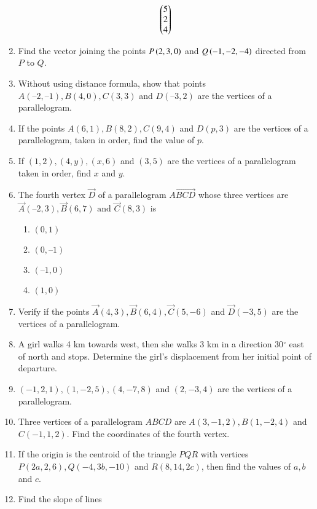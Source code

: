 \begin{enumerate}[label=\thesubsection.\arabic*,ref=\thesubsection.\theenumi]
\begin{align}
	\begin{pmatrix}5 \\ 2 \\ 4\end{pmatrix}  
\end{align}
\item Find the vector joining the points $P\left(2,3,0\right)$ and $Q\left(-1,-2,-4\right)$ directed from $P$ to $Q$.
\item Without using distance formula, show that points $A(– 2, – 1), B(4, 0), C(3, 3)$ and $D(–3, 2)$ are the vertices of a parallelogram.
\label{chapters/11/10/1/9}
\\
\solution

\item If the points $A(6, 1), B(8, 2), C(9, 4)$ and $D(p, 3)$ are the vertices of a parallelogram, taken in order, find the value of $p$.
\label{10/7/0/10}
\item 
If $(1, 2), (4, y), (x, 6)$ and $(3, 5)$ are the vertices of a parallelogram taken in order, find $x$ and $y$.
\label{10/7/2/6}
	\\
		\solution
	
\item The fourth vertex $\vec{D}$ of a parallelogram $\vec{ABCD}$ whose three vertices are
	$\vec{A} (–2, 3), \vec{B} (6, 7)\text { and } \vec{C} (8, 3)$ is
\begin{enumerate}
	\item $(0, 1)$
	\item $(0, –1)$
	\item $ (–1,0)$
	\item$(1, 0)$
\end{enumerate}
\item Verify if the points $\vec{A}(4,3), \vec{B}(6,4),\vec{C}(5,-6)$  and  $\vec{D}(-3,5)$ are the vertices of a parallelogram.
\item A girl walks 4 km towards west, then she walks 3 km in a direction 30$^{\circ}$ east of north and stops. Determine the girl's displacement from her initial point of departure.\\
	\solution
		
\item $(-1,2,1), (1,-2,5), (4,-7,8)$ and $(2,-3,4)$ are the vertices of a parallelogram.
\item Three vertices of a parallelogram $ABCD$ are $A(3,-1,2), B(1,-2,4)$ and $C(-1,1,2)$. Find the coordinates of the fourth vertex.
\item If the origin is the centroid of the triangle $PQR$ with vertices $P(2a,2,6), Q(-4,3b,-10)$ and $R(8,14,2c)$, then find the values of $a, b$ and $c$.
\item Find the slope of lines

\end{enumerate}
